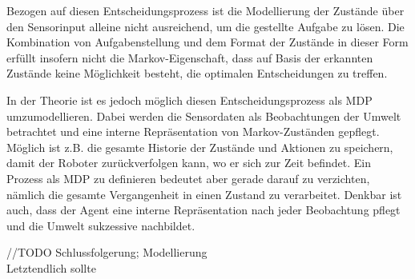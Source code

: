 Bezogen auf diesen Entscheidungsprozess ist die Modellierung der Zustände über den Sensorinput alleine nicht ausreichend, um die gestellte Aufgabe zu lösen. Die Kombination von Aufgabenstellung und dem Format der Zustände in dieser Form erfüllt insofern nicht die Markov-Eigenschaft, dass auf Basis der erkannten Zustände keine Möglichkeit besteht, die optimalen Entscheidungen zu treffen. 
\par

In der Theorie ist es jedoch möglich diesen Entscheidungsprozess als MDP umzumodellieren. Dabei werden die Sensordaten als Beobachtungen der Umwelt betrachtet und eine interne Repräsentation von Markov-Zuständen gepflegt. Möglich ist z.B. die gesamte Historie der Zustände und Aktionen zu speichern, damit der Roboter zurückverfolgen kann, wo er sich zur Zeit befindet. Ein Prozess als MDP zu definieren bedeutet aber gerade darauf zu verzichten, nämlich die gesamte Vergangenheit in einen Zustand zu verarbeitet. Denkbar ist auch, dass der Agent eine interne Repräsentation nach jeder Beobachtung pflegt und die Umwelt suk­zes­si­ve nachbildet.
\par 
//TODO Schlussfolgerung; Modellierung
\\
Letztendlich sollte 


